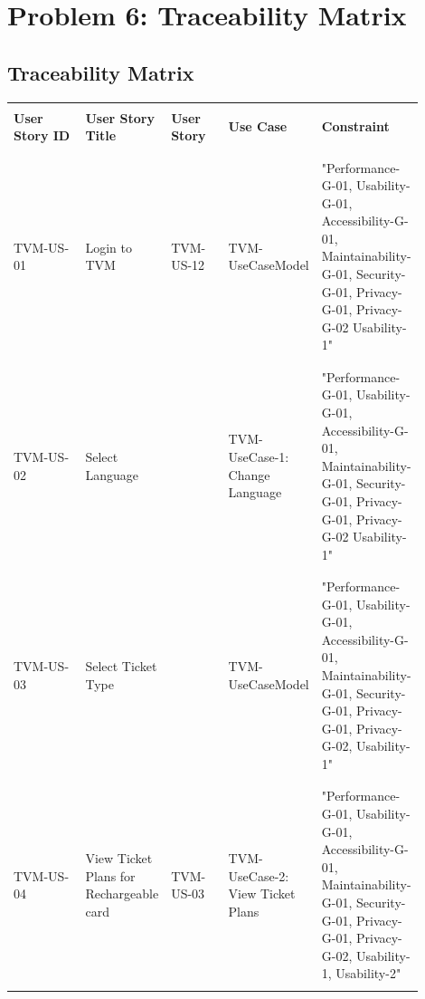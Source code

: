 \documentclass[a4paper,12pt]{report}
\begin{document}
\newpage

\section{Problem 6: Traceability Matrix \cite{traceabilitykamthan}}


\subsection{Traceability Matrix}
\begin{longtable}{ | p{0.2\linewidth} | p{0.2\linewidth} | p{0.15\linewidth} | p{0.15\linewidth} | p{0.2\linewidth} | }
	\hline
	
	& & & & \\
	\textbf{User Story ID} & \textbf{User Story Title} & \textbf{User Story} & \textbf{Use Case} & \textbf{Constraint} \\
	& & & & \\
	\hline
	
	& & & & \\
	TVM-US-01 & Login to TVM & TVM-US-12 & TVM-UseCaseModel	& "Performance-G-01, Usability-G-01, Accessibility-G-01, Maintainability-G-01, Security-G-01, Privacy-G-01, Privacy-G-02
	Usability-1"\\ 
	& & & & \\
	\hline
	
	& & & & \\
	TVM-US-02 &	Select Language	 &  & TVM-UseCase-1: Change Language & "Performance-G-01, Usability-G-01, Accessibility-G-01, Maintainability-G-01, Security-G-01, Privacy-G-01, Privacy-G-02 Usability-1" \\
	& & & & \\
	\hline
	
	& & & & \\
	TVM-US-03 & Select Ticket Type &  & TVM-UseCaseModel & "Performance-G-01, Usability-G-01, Accessibility-G-01, Maintainability-G-01, Security-G-01, Privacy-G-01, Privacy-G-02,	Usability-1" \\
	& & & & \\
	\hline
	
	& & & & \\
	TVM-US-04 & View Ticket Plans for Rechargeable card & TVM-US-03 & TVM-UseCase-2: View Ticket Plans & "Performance-G-01, Usability-G-01, Accessibility-G-01, Maintainability-G-01, Security-G-01, Privacy-G-01, Privacy-G-02, Usability-1, Usability-2" \\
	& & & & \\
	\hline
	

\end{longtable}
\end{document}
